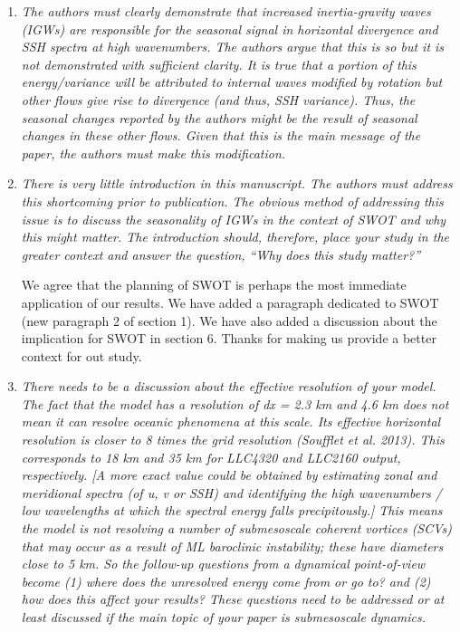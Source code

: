 \documentclass[11pt]{article}
\newcommand{\bdp}{\begin{description}}
\newcommand{\edp}{\end{description}}
\begin{document}
\begin{enumerate}

  \item {\it The authors must clearly demonstrate that increased inertia-gravity waves (IGWs) are
        responsible for the seasonal signal in horizontal divergence and SSH spectra at high
        wavenumbers. The authors argue that this is so but it is not demonstrated with sufficient
        clarity. It is true that a portion of this energy/variance will be attributed to internal waves
        modified by rotation but other flows give rise to divergence (and thus, SSH variance). Thus,
        the seasonal changes reported by the authors might be the result of seasonal changes in these
        other flows. Given that this is the main message of the paper, the authors must make this
        modification.}

  \item {\it There is very little introduction in this manuscript. The authors must address this
          shortcoming prior to publication. The obvious method of addressing this issue is to discuss
          the seasonality of IGWs in the context of SWOT and why this might matter. The introduction
          should, therefore, place your study in the greater context and answer the question,
          ``Why does this study matter?''}\\

          \bdp
              We agree that the planning of SWOT is perhaps the most immediate
              application of our results. We have added a paragraph dedicated to SWOT (new
              paragraph 2 of section 1). We have also added a discussion about the
              implication for SWOT in section 6. Thanks for making us provide a better
              context for out study.
          \edp

  \item {\it There needs to be a discussion about the effective resolution of your model. The fact that
        the model has a resolution of dx = 2.3 km and 4.6 km does not mean it can resolve oceanic
        phenomena at this scale. Its effective horizontal resolution is closer to 8 times the grid
        resolution (Soufflet et al. 2013). This corresponds to 18 km and 35 km for LLC4320 and
        LLC2160 output, respectively. [A more exact value could be obtained by estimating zonal
        and meridional spectra (of u, v or SSH) and identifying the high wavenumbers / low
        wavelengths at which the spectral energy falls precipitously.] This means the model is not
        resolving a number of submesoscale coherent vortices (SCVs) that may occur as a result of
        ML baroclinic instability; these have diameters close to 5 km. So the follow-up questions
        from a dynamical point-of-view become (1) where does the unresolved energy come from or
        go to? and (2) how does this affect your results? These questions need to be addressed or at
        least discussed if the main topic of your paper is submesoscale dynamics.}


\end{enumerate}
\end{document}
